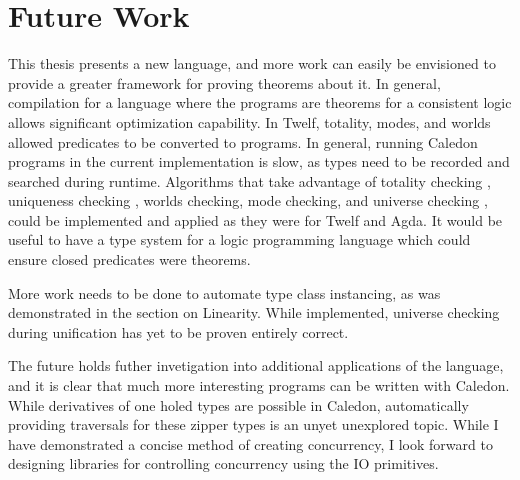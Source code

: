 \section{Future Work}

This thesis presents a new language, and more work can easily be envisioned to provide a greater
framework for proving theorems about it. In general, compilation for a language
where the programs are theorems for a consistent logic allows significant optimization
capability. In Twelf, totality, modes, and worlds allowed predicates to be converted
to programs. In general, running Caledon programs in the current implementation
is slow, as types need to be recorded and searched during runtime. Algorithms
that take advantage of totality checking \citep{altenkirch2010termination}, 
uniqueness checking \citep{anderson2004verifying}, 
worlds checking\citep{anderson2004verifying}, 
mode checking\citep{anderson2004verifying}, 
and universe checking \citep{harper1991type}, 
could be implemented and applied as they were for Twelf and Agda.  It would be useful to have a type system for a logic programming
language which could ensure closed predicates were theorems. 

More work needs to be done to automate type class instancing, as was demonstrated in the section on Linearity.
While implemented, universe checking during unification has yet to be proven entirely
correct.

The future holds futher invetigation into additional applications of the language, and
it is clear that much more interesting programs can be written with Caledon. While derivatives of one
holed types are possible in Caledon, automatically providing traversals for these
zipper types is an unyet unexplored topic. While I have demonstrated a concise method of
creating concurrency, I look forward to designing libraries for controlling concurrency using the IO primitives.

